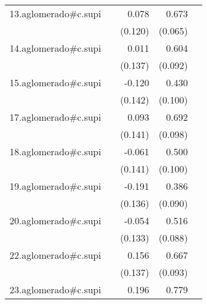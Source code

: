 {\begin{longtable}{l*{4}{D{.}{.}{-1}}}
\addlinespace
13.aglomerado#c.supi&                     &       0.078         &       0.673\sym{***}&                     \\
            &                     &     (0.120)         &     (0.065)         &                     \\
\addlinespace
14.aglomerado#c.supi&                     &       0.011         &       0.604\sym{***}&                     \\
            &                     &     (0.137)         &     (0.092)         &                     \\
\addlinespace
15.aglomerado#c.supi&                     &      -0.120         &       0.430\sym{***}&                     \\
            &                     &     (0.142)         &     (0.100)         &                     \\
\addlinespace
17.aglomerado#c.supi&                     &       0.093         &       0.692\sym{***}&                     \\
            &                     &     (0.141)         &     (0.098)         &                     \\
\addlinespace
18.aglomerado#c.supi&                     &      -0.061         &       0.500\sym{***}&                     \\
            &                     &     (0.141)         &     (0.100)         &                     \\
\addlinespace
19.aglomerado#c.supi&                     &      -0.191         &       0.386\sym{***}&                     \\
            &                     &     (0.136)         &     (0.090)         &                     \\
\addlinespace
20.aglomerado#c.supi&                     &      -0.054         &       0.516\sym{***}&                     \\
            &                     &     (0.133)         &     (0.088)         &                     \\
\addlinespace
22.aglomerado#c.supi&                     &       0.156         &       0.667\sym{***}&                     \\
            &                     &     (0.137)         &     (0.093)         &                     \\
\addlinespace
23.aglomerado#c.supi&                     &       0.196         &       0.779\sym{***}&                     \\

\end{longtable}}
